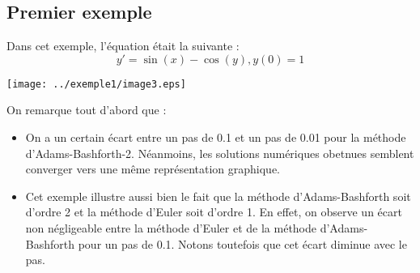 \subsection{Premier exemple}
Dans cet exemple, l'équation était la suivante :
\[y'=\sin(x) - \cos(y), y(0)=1\]



\begin{center}
	\texttt{[image: ../exemple1/image3.eps]}
\end{center}

On remarque tout d'abord que :
\begin{itemize}
	\item On a un certain écart entre un pas de 0.1 et un pas de 0.01 pour la méthode d'Adams-Bashforth-2. Néanmoins, les solutions numériques obetnues semblent converger vers une même représentation graphique. 
	\item Cet exemple illustre aussi bien le fait que la méthode d'Adams-Bashforth soit d'ordre 2 et la méthode d'Euler soit d'ordre 1. En effet, on observe un écart non négligeable entre la méthode d'Euler et de la méthode d'Adams-Bashforth pour un pas de 0.1. Notons toutefois que cet écart diminue avec le pas.
\end{itemize}
